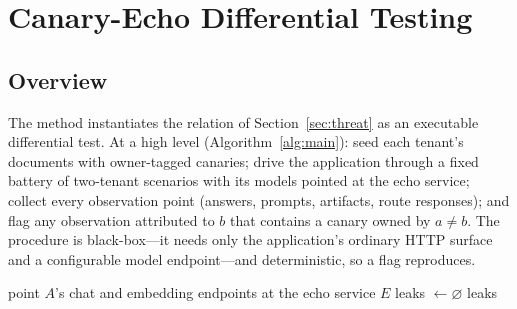 \IfFileExists{IEEEtran.cls}{\documentclass[conference]{IEEEtran}}{\documentclass[10pt,twocolumn]{article}}
\begin{document}
\section{Canary-Echo Differential Testing}
\label{sec:method}

\subsection{Overview}
The method instantiates the relation of Section~\ref{sec:threat} as an executable differential test.
At a high level (Algorithm~\ref{alg:main}): seed each tenant's documents with owner-tagged canaries;
drive the application through a fixed battery of two-tenant scenarios with its models pointed at the
echo service; collect every observation point (answers, prompts, artifacts, route responses); and
flag any observation attributed to $b$ that contains a canary owned by $a\neq b$. The procedure is
black-box---it needs only the application's ordinary HTTP surface and a configurable model
endpoint---and deterministic, so a flag reproduces.

\begin{algorithm}[t]
\footnotesize
\DontPrintSemicolon
{}
point $A$'s chat and embedding endpoints at the echo service $E$\;
leaks $\gets \varnothing$\;
\Return leaks\;
\caption{Canary-echo differential isolation test}
\label{alg:main}
\end{algorithm}
\end{document}
